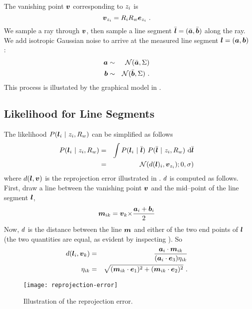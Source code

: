 The vanishing point $\vpt$ corresponding to $\Indicator_i$ is
\begin{equation}
  \vpt_{\Indicator_i} = \CamR_i \SceneR \ebasis_{\Indicator_i} ~.
\end{equation}
We sample a ray through $\vpt$, then sample a line segment $\TrueSeg =
(\TrueStartPt,\TrueEndPt)$ along the ray. We add isotropic Gaussian
noise to arrive at the measured line segment
$\LineSeg=(\StartPt,\EndPt)$:
\begin{eqnarray}
  \StartPt &\sim& \NormalDistr(\TrueStartPt, \Sigma) \\
  \EndPt &\sim& \NormalDistr(\TrueEndPt, \Sigma) ~.
\end{eqnarray}
This process is illustated by the graphical model in .

\subsection{Likelihood for Line Segments}

The likelihood $P(\LineSeg_i ~|~ \Indicator_i,\SceneR)$ can be
simplified as follows
\begin{eqnarray}
  P(\LineSeg_i ~|~ \Indicator_i,\SceneR) &=& 
  \int
    P(\LineSeg_i ~|~ \TrueSeg)
    ~ P(\TrueSeg ~|~ \Indicator_i,\SceneR)
  ~\intd \TrueSeg \\
  &=&
    \NormalDistr(\dist(\LineSeg)_i,\vpt_{\Indicator_i}); 0, \sigma)
\end{eqnarray}
where $\dist(\LineSeg,\vpt)$ is the reprojection error illustrated in
. $\dist$ is computed as follows. First,
draw a line between the vanishing point $\vpt$ and the mid--point of
the line segment $\LineSeg$,
\begin{equation}
  \ReprojLine_{ik} =
    \vpt_k \cross \frac{\StartPt_i+\EndPt_i}{2}
\end{equation}
Now, $\dist$ is the distance between the line $\ReprojLine$ and either
of the two end points of $\LineSeg$ (the two quantities are equal, as
evident by inspecting ). So
\begin{eqnarray}
  \dist(\LineSeg_i,\vpt_k) &=& 
  \frac
    {\StartPt_i \cdot \ReprojLine_{ik}}
    {(\StartPt_{i}\cdot\ez) \eta_{ik}}\\
  \eta_{ik} &=&
   \sqrt{(\ReprojLine_{ik} \cdot \ex)^2 +
         (\ReprojLine_{ik} \cdot \ey)^2}
  ~.
\end{eqnarray}

\begin{figure}[tb]
  \centering
  \texttt{[image: reprojection-error]}
  \caption{Illustration of the reprojection error.}
  \label{fig:reprojection-error}
\end{figure}

